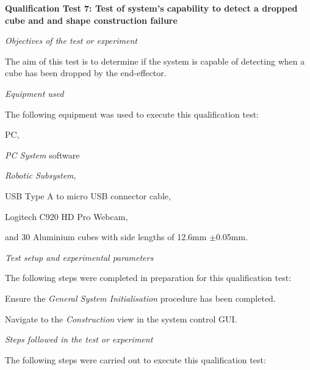 \textbf{Qualification Test 7: Test of system's capability to detect a dropped cube and and shape construction failure}

\textit{Objectives of the test or experiment}

The aim of this test is to determine if the system is capable of detecting when a cube has been dropped by the end-effector.

\textit{Equipment used}

The following equipment was used to execute this qualification test:

\begin{compactitem}
	\item PC,
	\item \textit{PC System} software
	\item \textit{Robotic Subsystem},
	\item USB Type A to micro USB connector cable,
	\item Logitech C920 HD Pro Webcam,
	\item and 30 Aluminium cubes with side lengths of 12.6mm $\pm$0.05mm.
\end{compactitem}

\textit{Test setup and experimental parameters}

The following steps were completed in preparation for this qualification test:

\begin{compactenum}
	\item Ensure the \textit{General System Initialisation} procedure has been completed.
	\item Navigate to the \textit{Construction} view in the system control GUI.
\end{compactenum}

\textit{Steps followed in the test or experiment}

The following steps were carried out to execute this qualification test:

